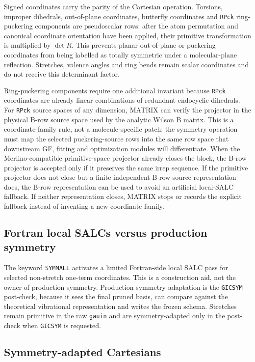 \documentclass[11pt]{article}
\newcommand{\gauin}{\texttt{gauin}}
\begin{document}
Signed coordinates carry the parity of the Cartesian operation.  Torsions,
improper dihedrals, out-of-plane coordinates, butterfly coordinates and
\texttt{RPck} ring-puckering components are pseudoscalar rows: after the atom
permutation and canonical coordinate orientation have been applied, their
primitive transformation is multiplied by \(\det R\).  This prevents planar
out-of-plane or puckering coordinates from being labelled as totally symmetric
under a molecular-plane reflection.  Stretches, valence angles and ring bends
remain scalar coordinates and do not receive this determinant factor.

\noindent
Ring-puckering components require one additional invariant because
\texttt{RPck} coordinates are already linear combinations of redundant
endocyclic dihedrals.  For \texttt{RPck} source spaces of any dimension,
MATRIX can verify the projector in the physical B-row source space used by the
analytic Wilson B matrix.  This is a coordinate-family rule, not a
molecule-specific patch: the symmetry operation must map the selected
puckering-source rows into the same row space that downstream GF, fitting and
optimization modules will differentiate.  When the Merlino-compatible
primitive-space projector already closes the block, the B-row projector is
accepted only if it preserves the same irrep sequence.  If the primitive
projector does not close but a finite independent B-row source representation
does, the B-row representation can be used to avoid an artificial local-SALC
fallback.  If neither representation closes, MATRIX stops or records the
explicit fallback instead of inventing a new coordinate family.

\subsection{Fortran local SALCs versus production symmetry}

The keyword \texttt{SYMMALL} activates a limited Fortran-side local SALC pass
for selected non-stretch one-term coordinates.  This is a construction aid, not
the owner of production symmetry.  Production symmetry adaptation is the
\texttt{GICSYM} post-check, because it sees the final pruned basis, can compare
against the theoretical vibrational representation and writes the frozen
schema.  Stretches remain primitive in the raw \gauin{} and are symmetry-adapted
only in the post-check when \texttt{GICSYM} is requested.

\subsection{Symmetry-adapted Cartesians}
\end{document}
